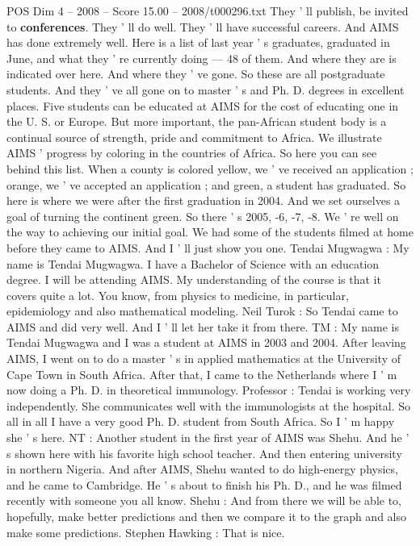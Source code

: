 \begin{textsample}{POS Dim 4 – 2008 – Score 15.00 – 2008/t000296.txt}
They ' ll publish, be invited to \textbf{conferences}.
They ' ll do well.
They ' ll have successful careers.
And AIMS has done extremely well.
Here is a list of last year ' s graduates, graduated in June, and what they ' re currently doing — 48 of them.
And where they are is indicated over here.
And where they ' ve gone.
So these are all postgraduate students.
And they ' ve all gone on to master ' s and Ph.
D. degrees in excellent places.
Five students can be educated at AIMS for the cost of educating one in the U.
S. or Europe.
But more important, the pan-African student body is a continual source of strength, pride and commitment to Africa.
We illustrate AIMS ' progress by coloring in the countries of Africa.
So here you can see behind this list.
When a county is colored yellow, we ' ve received an application ; orange, we ' ve accepted an application ; and green, a student has graduated.
So here is where we were after the first graduation in 2004.
And we set ourselves a goal of turning the continent green.
So there ' s 2005, -6, -7, -8.
We ' re well on the way to achieving our initial goal.
We had some of the students filmed at home before they came to AIMS.
And I ' ll just show you one.
Tendai Mugwagwa : My name is Tendai Mugwagwa.
I have a Bachelor of Science with an education degree.
I will be attending AIMS.
My understanding of the course is that it covers quite a lot.
You know, from physics to medicine, in particular, epidemiology and also mathematical modeling.
Neil Turok : So Tendai came to AIMS and did very well.
And I ' ll let her take it from there.
TM : My name is Tendai Mugwagwa and I was a student at AIMS in 2003 and 2004.
After leaving AIMS, I went on to do a master ' s in applied mathematics at the University of Cape Town in South Africa.
After that, I came to the Netherlands where I ' m now doing a Ph.
D. in theoretical immunology.
Professor : Tendai is working very independently.
She communicates well with the immunologists at the hospital.
So all in all I have a very good Ph.
D. student from South Africa.
So I ' m happy she ' s here.
NT : Another student in the first year of AIMS was Shehu.
And he ' s shown here with his favorite high school teacher.
And then entering university in northern Nigeria.
And after AIMS, Shehu wanted to do high-energy physics, and he came to Cambridge.
He ' s about to finish his Ph.
D., and he was filmed recently with someone you all know.
Shehu : And from there we will be able to, hopefully, make better predictions and then we compare it to the graph and also make some predictions.
Stephen Hawking : That is nice.

\end{textsample}
